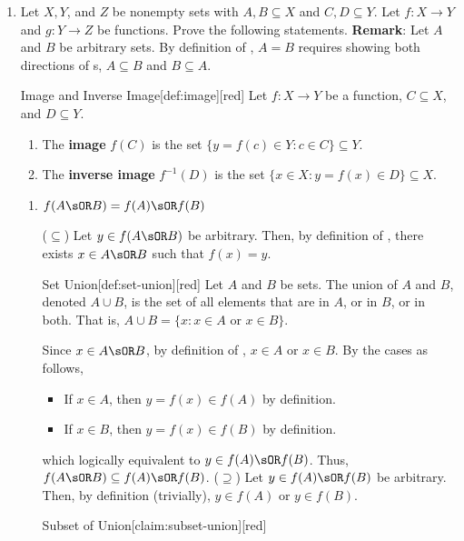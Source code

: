 \begin{enumerate}
  \newpage 
  \item Let $X, Y$, and $Z$ be nonempty sets with $A, B \subseteq X$ and $C, D \subseteq Y$. 
  Let $f: X \rightarrow Y$ and $g: Y \rightarrow Z$ be functions. 
  Prove the following statements.
  \textbf{Remark}: Let $A$ and $B$ be arbitrary sets. By definition of , 
  $A = B$ requires showing both directions of s, $A \subseteq B$ and $B \subseteq A$.
  \begin{define}{Image and Inverse Image}[def:image][red]
    Let $f : X \to Y$ be a function, $C\subseteq X$, and $D\subseteq Y$. 
    \begin{enumerate}
      \item The \textbf{image} $f(C)$ is the set $\{y=f(c) \in Y : c \in C\} \subseteq Y$.
      \item The \textbf{inverse image} $f^{-1}(D)$ is the set $\{x \in X : y=f(x) \in D\} \subseteq X$.
    \end{enumerate}
  \end{define} 
  \begin{enumerate}
    \item $f(A \sOR B)=f(A) \sOR f(B)$ \label{prob:3a}
    \begin{subprove}
      ($\subseteq$) Let $y \in f(A \sOR B)$ be arbitrary. Then, by definition of , 
      there exists $x \in A \sOR B$ such that $f(x) = y$.      
      \begin{define}{Set Union}[def:set-union][red]
        Let $A$ and $B$ be sets. The union of $A$ and $B$, denoted $A \cup B$, is the 
        set of all elements that are in $A$, or in $B$, or in both. 
        That is, $A \cup B = \{x : x \in A \text{ or } x \in B\}$.
      \end{define}
      Since $x \in A \sOR B$, by definition of , $x \in A$ or $x \in B$. By the cases as follows,
      \begin{itemize}
        \item If $x \in A$, then $y = f(x) \in f(A)$ by definition.
        \item If $x \in B$, then $y = f(x) \in f(B)$ by definition.
      \end{itemize}
      which logically equivalent to $y \in f(A) \sOR f(B)$.
      Thus, $f(A \sOR B) \subseteq f(A) \sOR f(B)$.\proofstep
      ($\supseteq$) Let $y \in f(A) \sOR f(B)$ be arbitrary. Then, by definition (trivially), 
      $y \in f(A)$ or $y \in f(B)$.
      \begin{define}{Subset of Union}[claim:subset-union][red]

\end{define}
\end{subprove}
\end{enumerate}
\end{enumerate}

